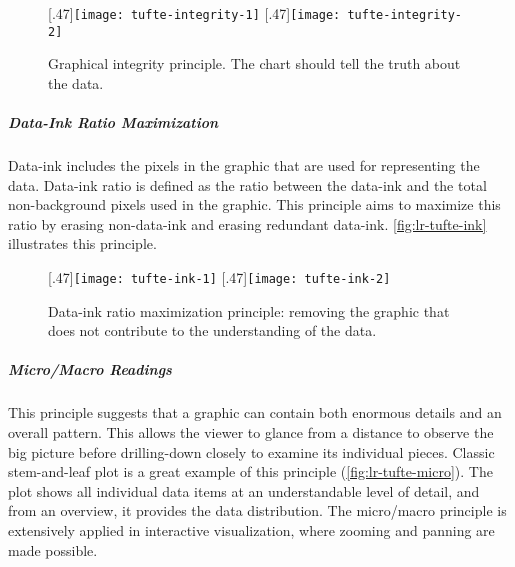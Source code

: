 \begin{figure}[!htb]
	\centering
	[.47\columnwidth]{\texttt{[image: tufte-integrity-1]}} 
	\hfill
	[.47\columnwidth]{\texttt{[image: tufte-integrity-2]}} 
	\caption[Graphical integrity principle]{Graphical integrity principle. The chart should tell the truth about the data.}
	\label{fig:lr-tufte-integrity}
\end{figure}

\subparagraph{Data-Ink Ratio Maximization}
Data-ink includes the pixels in the graphic that are used for representing the data. Data-ink ratio is defined as the ratio between the data-ink and the total non-background pixels used in the graphic. This principle aims to maximize this ratio by erasing non-data-ink and erasing redundant data-ink. \autoref{fig:lr-tufte-ink} illustrates this principle.

\begin{figure}[!htb]
	\centering
	[.47\columnwidth]{\texttt{[image: tufte-ink-1]}} 
	\hfill
	[.47\columnwidth]{\texttt{[image: tufte-ink-2]}} 
	\caption[Data-ink ratio maximization principle]{Data-ink ratio maximization principle: removing the graphic that does not contribute to the understanding of the data.}
	\label{fig:lr-tufte-ink}
\end{figure}

\subparagraph{Micro/Macro Readings}
This principle suggests that a graphic can contain both enormous details and an overall pattern. This allows the viewer to glance from a distance to observe the big picture before drilling-down closely to examine its individual pieces. Classic stem-and-leaf plot is a great example of this principle (\autoref{fig:lr-tufte-micro}). The plot shows all individual data items at an understandable level of detail, and from an overview, it provides the data distribution. The micro/macro principle is extensively applied in interactive visualization, where zooming and panning are made possible.


